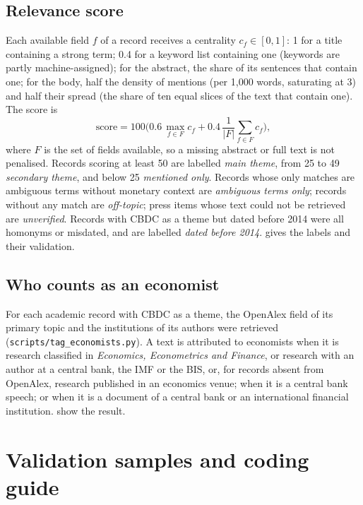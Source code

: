\documentclass[11pt,a4paper]{article}
\begin{document}
\subsection{Relevance score}
Each available field $f$ of a record receives a centrality $c_f\in[0,1]$: 1 for a title containing a strong term; 0.4 for a keyword list containing one (keywords are partly machine-assigned); for the abstract, the share of its sentences that contain one; for the body, half the density of mentions (per 1{,}000 words, saturating at 3) and half their spread (the share of ten equal slices of the text that contain one). The score is
\[ \text{score} = 100\Big(0.6\,\max_{f\in F} c_f + 0.4\,\frac{1}{|F|}\sum_{f\in F} c_f\Big), \]
where $F$ is the set of fields available, so a missing abstract or full text is not penalised. Records scoring at least 50 are labelled \emph{main theme}, from 25 to 49 \emph{secondary theme}, and below 25 \emph{mentioned only}. Records whose only matches are ambiguous terms without monetary context are \emph{ambiguous terms only}; records without any match are \emph{off-topic}; press items whose text could not be retrieved are \emph{unverified}. Records with CBDC as a theme but dated before 2014 were all homonyms or misdated, and are labelled \emph{dated before 2014}.  gives the labels and their validation.



\subsection{Who counts as an economist}
For each academic record with CBDC as a theme, the OpenAlex field of its primary topic and the institutions of its authors were retrieved (\texttt{scripts/tag\_economists.py}). A text is attributed to economists when it is research classified in \emph{Economics, Econometrics and Finance}, or research with an author at a central bank, the IMF or the BIS, or, for records absent from OpenAlex, research published in an economics venue; when it is a central bank speech; or when it is a document of a central bank or an international financial institution.  show the result.




\section{Validation samples and coding guide}\label{app:validation}
\end{document}

